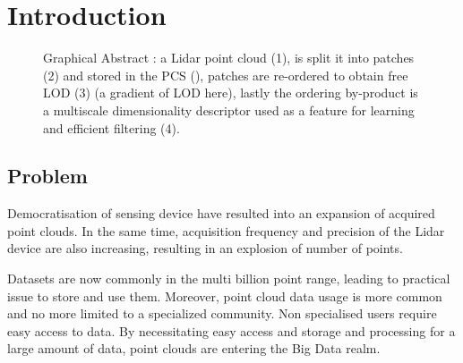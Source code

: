 


\section{Introduction}

\begin{figure}[t!]
	\begin{center}
		\caption{Graphical Abstract : a Lidar point cloud (1), is split it into patches (2) 
		and stored in the PCS (\cite{Cura2015}), patches are re-ordered to obtain free LOD 
		(3) (a gradient of LOD here), lastly the ordering by-product is a multiscale dimensionality descriptor used as a feature for learning and efficient filtering (4).} 
		\label{lod.fig:banner_image}
	\end{center}
\end{figure} 

\subsection{Problem}   
	Democratisation of sensing device have resulted into an expansion of acquired point clouds.
	In the same time, acquisition frequency and precision of the Lidar device are also increasing,
	resulting in an explosion of number of points.
	
	
	Datasets are now commonly in the multi billion point range, leading to practical issue to store and use them.
	Moreover, point cloud data usage is more common and no more limited to a specialized community. 
	Non specialised users require easy access to data.
	By necessitating easy access and storage and processing for a large amount of data, point clouds are entering the Big Data realm.
	
